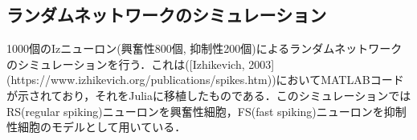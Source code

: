 \subsection{ランダムネットワークのシミュレーション}1000個のIzニューロン(興奮性800個, 抑制性200個)によるランダムネットワークのシミュレーションを行う．これは([Izhikevich, 2003](https://www.izhikevich.org/publications/spikes.htm))においてMATLABコードが示されており，それをJuliaに移植したものである．このシミュレーションではRS(regular spiking)ニューロンを興奮性細胞，FS(fast spiking)ニューロンを抑制性細胞のモデルとして用いている．
